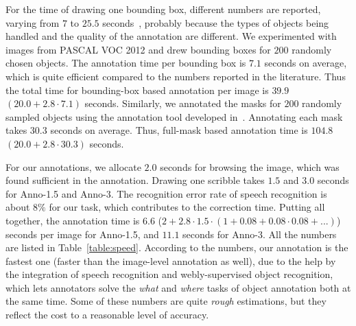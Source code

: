 For the time of drawing one bounding box, different
numbers are reported, varying from $7$ to $25.5$
seconds~\citep{best:two:world, annotation:strength}, probably because
the types of objects being handled and the quality of the annotation
are different. We experimented with images from PASCAL VOC 2012
and drew bounding boxes for $200$ randomly chosen objects. 
The annotation time per bounding box is $7.1$ seconds on average,
which is quite efficient compared to the numbers reported in the
literature. Thus the total time for bounding-box based annotation per image is
$39.9$ $(20.0+2.8 \cdot 7.1)$ seconds. Similarly, we annotated the masks for
$200$ randomly sampled objects using the annotation tool developed
in~\citep{open:surface}.
Annotating each mask takes $30.3$ seconds on
average. Thus, full-mask based annotation time is $104.8$
$(20.0+2.8\cdot 30.3)$ seconds.   %

For our annotations, we allocate $2.0$ seconds for browsing the image, which was found sufficient in the annotation. Drawing one scribble takes $1.5$ and $3.0$ seconds for Anno-1.5 and
Anno-3. The recognition error rate of speech recognition is about
$8\%$ for our task, which contributes to the correction time. Putting
all together, the annotation time is $6.6$ ($2+2.8\cdot 1.5\cdot (1+0.08+0.08\cdot 0.08 + 
...)$) seconds per image for Anno-1.5, and $11.1$ seconds for
Anno-3.  All the
numbers are listed in Table~\ref{table:speed}. According to the
numbers, our annotation is the fastest one (faster than the
image-level annotation as well), due to the help by the integration of speech
recognition and webly-supervised object recognition, which lets annotators solve the \emph{what} and \emph{where} tasks of object annotation both at the same time. Some of these numbers are quite \emph{rough} estimations, but
they reflect the cost to a reasonable level of accuracy.




